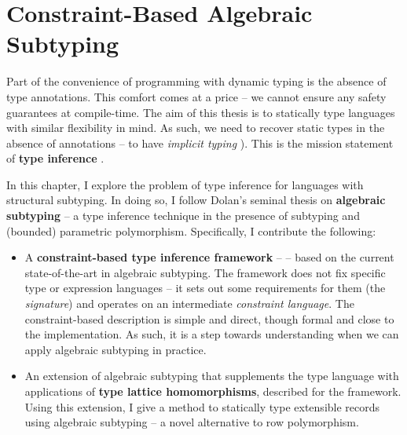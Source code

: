 \newcommand{\mlsub}{\textsc{MLsub}}
\newcommand{\simplesub}{\textsc{Simple-sub}}
\newcommand{\mlstruct}{\textsc{MLstruct}}
\newenvironment{example}{ %
    \begin{tcolorbox}[ %
        colback=blue!5!white, %
        colframe=blue!60!black, %
        title=\textsc{Example} %
    ] %
}{ %
    \end{tcolorbox} %
}

\chapter{Constraint-Based Algebraic Subtyping}
\label{algebraic-subtyping}

Part of the convenience of programming with dynamic typing is the absence of type annotations. 
This comfort comes at a price -- we cannot ensure any safety guarantees at compile-time. 
The aim of this thesis is to statically type languages with similar flexibility in mind. As such, we need to recover static types in the absence of annotations -- to have \emph{implicit typing} \cite{remy-record-inference}). This is the mission statement of \textbf{type inference} \cite{tapl}.

In this chapter, I explore the problem of type inference for languages with structural subtyping. In doing so, I follow Dolan's seminal thesis on \textbf{algebraic subtyping} -- a type inference technique in the presence of subtyping and (bounded) parametric polymorphism. Specifically, I contribute the following:
\begin{itemize}
    \item A \textbf{constraint-based type inference framework} -- \inference{} -- based on the current state-of-the-art in algebraic subtyping. The framework does not fix specific type or expression languages -- it sets out some requirements for them (the \textit{signature}) and operates on an intermediate \emph{constraint language}. The constraint-based description is simple and direct, though formal and close to the implementation. As such, it is a step towards understanding when we can apply algebraic subtyping in practice.
    \item An extension of algebraic subtyping that supplements the type language with applications of \textbf{type lattice homomorphisms}, described for the framework. Using this extension, I give a method to statically type extensible records using algebraic subtyping -- a novel alternative to row polymorphism. 
\end{itemize}


